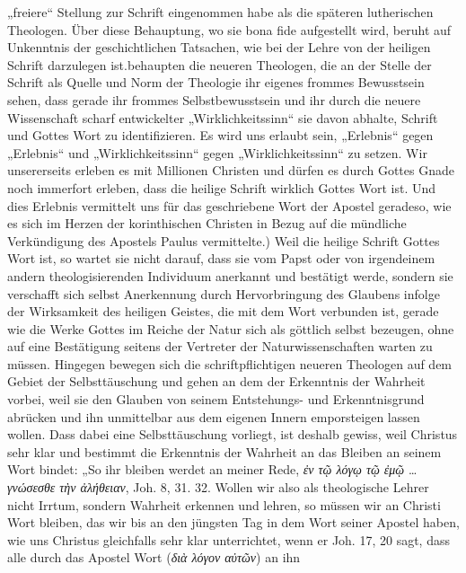„freiere“ Stellung zur Schrift eingenommen habe als die späteren lutherischen Theologen. Über diese Behauptung, wo sie bona fide aufgestellt wird, beruht auf Unkenntnis der geschichtlichen Tatsachen, wie bei der Lehre von der heiligen Schrift darzulegen ist.\n\nBekanntlich behaupten die neueren Theologen, die an der Stelle der Schrift als Quelle und Norm der Theologie ihr eigenes frommes Bewusstsein sehen, dass gerade ihr frommes Selbstbewusstsein und ihr durch die neuere Wissenschaft scharf entwickelter „Wirklichkeitssinn“ sie davon abhalte, Schrift und Gottes Wort zu identifizieren. Es wird uns erlaubt sein, „Erlebnis“ gegen „Erlebnis“ und „Wirklichkeitssinn“ gegen „Wirklichkeitssinn“ zu setzen. Wir unsererseits erleben es mit Millionen Christen und dürfen es durch Gottes Gnade noch immerfort erleben, dass die heilige Schrift wirklich Gottes Wort ist. Und dies Erlebnis vermittelt uns für das geschriebene Wort der Apostel geradeso, wie es sich im Herzen der korinthischen Christen in Bezug auf die mündliche Verkündigung des Apostels Paulus vermittelte.) Weil die heilige Schrift Gottes Wort ist, so wartet sie nicht darauf, dass sie vom Papst oder von irgendeinem andern theologisierenden Individuum anerkannt und bestätigt werde, sondern sie verschafft sich selbst Anerkennung durch Hervorbringung des Glaubens infolge der Wirksamkeit des heiligen Geistes, die mit dem Wort verbunden ist, gerade wie die Werke Gottes im Reiche der Natur sich als göttlich selbst bezeugen, ohne auf eine Bestätigung seitens der Vertreter der Naturwissenschaften warten zu müssen. Hingegen bewegen sich die schriftpflichtigen neueren Theologen auf dem Gebiet der Selbsttäuschung und gehen an dem der Erkenntnis der Wahrheit vorbei, weil sie den Glauben von seinem Entstehungs- und Erkenntnisgrund abrücken und ihn unmittelbar aus dem eigenen Innern emporsteigen lassen wollen. Dass dabei eine Selbsttäuschung vorliegt, ist deshalb gewiss, weil Christus sehr klar und bestimmt die Erkenntnis der Wahrheit an das Bleiben an seinem Wort bindet: „So ihr bleiben werdet an meiner Rede, \textit{ἐν τῷ λόγῳ τῷ ἐμῷ} \dots \textit{γνώσεσθε τὴν ἀλήθειαν}, Joh. 8, 31. 32. Wollen wir also als theologische Lehrer nicht Irrtum, sondern Wahrheit erkennen und lehren, so müssen wir an Christi Wort bleiben, das wir bis an den jüngsten Tag in dem Wort seiner Apostel haben, wie uns Christus gleichfalls sehr klar unterrichtet, wenn er Joh. 17, 20 sagt, dass alle durch das Apostel Wort (\textit{διὰ λόγον αὐτῶν}) an ihn